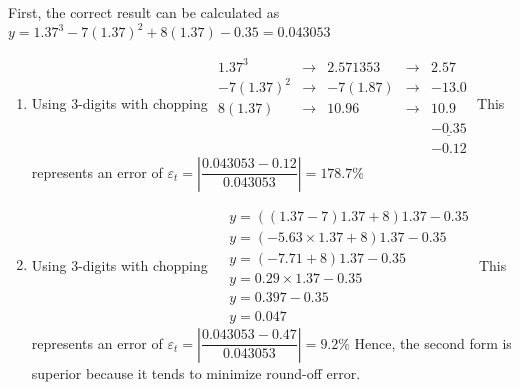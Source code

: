 \documentclass[../main.tex]{subfiles}
\begin{document}
\section{}
First, the correct result can be calculated as
\bigbreak
$y=1.37^{3}-7(1.37)^{2}+8(1.37)-0.35=0.043053$
\bigbreak
\begin{enumerate}[label=\bfseries(\alph*)]
\item Using 3-digits with chopping
\bigbreak
$\begin{array}{llllc}1.37^{3} & \rightarrow & 2.571353 & \rightarrow & 2.57 \\ -7(1.37)^{2} & \rightarrow & -7(1.87) & \rightarrow & -13.0 \\ 8(1.37) & \rightarrow & 10.96 & \rightarrow & 10.9 \\ & & & &\underline{ -0.35} \\ & & & & -0.12\end{array}$
\bigbreak
This represents an error of
\bigbreak
$\varepsilon_{t}=\left|\dfrac{0.043053-0.12}{0.043053}\right|=178.7 \%$
\bigbreak
\item Using 3-digits with chopping
\bigbreak
$
\begin{aligned}
&y=((1.37-7) 1.37+8) 1.37 - 0.35\\
&y=(-5.63 \times 1.37+8) 1.37  - 0.35\\
&y=(-7.71+8) 1.37-0.35 \\
&y=0.29 \times 1.37-0.35 \\
&y=0.397-0.35 \\
&y=0.047
\end{aligned}
$
\bigbreak
This represents an error of
\bigbreak
$\varepsilon_{t}=\left|\dfrac{0.043053-0.47}{0.043053}\right|=9.2 \%$
\bigbreak
Hence, the second form is superior because it tends to minimize round-off error.
\bigbreak
\end{enumerate}
\end{document}
